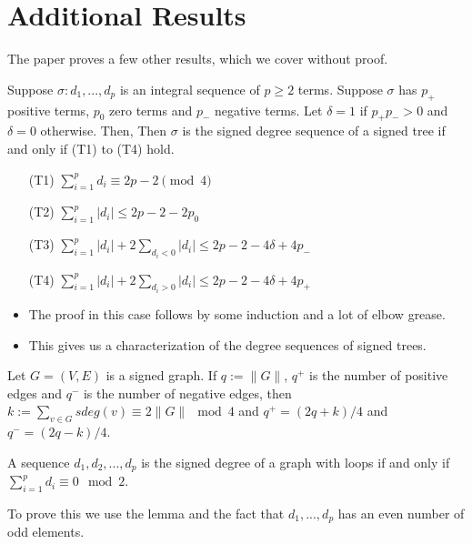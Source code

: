 \section{Additional Results}

\begin{frame}
	The paper proves a few other results, which we cover without proof.
		\begin{theorem}
			Suppose $\sigma : d_1,...,d_p$ is an integral sequence of $p \geq 2$ terms. Suppose $\sigma$ has $p_+$ positive terms, $p_0$ zero terms and $p_-$ negative terms. Let $\delta = 1$ if $p_+p_- > 0$ and $\delta = 0$ otherwise. Then, Then $\sigma$ is the signed degree sequence of a signed tree if and only if (T1) to (T4) hold.
			\begin{itemize}
				\item[(T1)] $\sum_{i = 1}^{p} d_i \equiv 2p - 2 \pmod 4$
				\item[(T2)] $\sum_{i = 1}^{p} \lvert d_i \rvert \le 2p - 2 - 2p_0$
				\item[(T3)] $\sum_{i = 1}^{p} \lvert d_i \rvert + 2\sum_{d_i < 0} \lvert d_i \rvert \leq 2p - 2 - 4\delta + 4p_-$
				\item[(T4)] $\sum_{i = 1}^{p} \lvert d_i \rvert + 2\sum_{d_i > 0} \lvert d_i \rvert \leq 2p - 2 - 4\delta + 4p_+$
			\end{itemize}
		\end{theorem}
	\begin{itemize}
		\item The proof in this case follows by some induction and a lot of elbow grease.
		\item This gives us a characterization of the degree sequences of signed trees.
	\end{itemize}
\end{frame}

\begin{frame}
	\begin{lemma}
		Let $G = (V,E)$ is a signed graph. If $q := \lVert G \rVert$, $q^+$ is the number of positive edges and $q^-$ is the number of negative edges, then $k := \sum_{v \in G} sdeg(v) \equiv 2\lVert G \rVert \mod 4$ and $q^+ = (2q+k)/4$ and $q^- = (2q-k)/4$.
	\end{lemma}
	\begin{theorem}
		A sequence $d_1, d_2, ..., d_p$ is the signed degree of a graph with loops if and only if $\sum_{i = 1}^{p} d_i \equiv 0 \mod 2$.
	\end{theorem}
	To prove this we use the lemma and the fact that $d_1,...,d_p$ has an even number of odd elements.
\end{frame}


